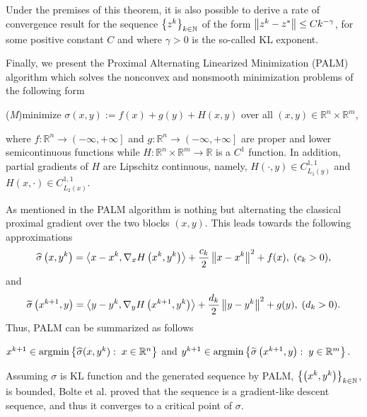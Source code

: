 \begin{remark}
Under the premises of this theorem, it is also possible to derive a rate of convergence result for the sequence $\left\lbrace z^k \right\rbrace_{k \in \mathbb{N}}$ of the form $\left\Vert {z^k - z^{*}} \right\Vert \leq Ck^{-\gamma}$, for some positive constant $C$ and where $\gamma>0$ is the so-called KL exponent.
\end{remark}

Finally, we present the Proximal Alternating Linearized Minimization (PALM) algorithm which solves the nonconvex and nonsmooth minimization problems of the following form
\begin{center}
(\textit{M})\quad minimize $\sigma(x,y):=f(x)+g(y)+H(x,y)$ over all $(x,y) \in \mathbb{R}^n \times \mathbb{R}^m$,
\end{center}
where $f:\mathbb{R}^n \rightarrow \left(-\infty,+\infty\right]$ and $g:\mathbb{R}^n \rightarrow \left(-\infty,+\infty\right]$ are proper and lower semicontinuous functions while $H:\mathbb{R}^n \times \mathbb{R}^m \rightarrow \mathbb{R}$ is a $C^1$ function. In addition, partial gradients of $H$ are Lipschitz continuous, namely, $H(\cdot, y) \in C^{1,1}_{L_1(y)}$ and $H(x,\cdot) \in C^{1,1}_{L_2(x)}$.\medskip

As mentioned in \cite{BST2014} the PALM algorithm is nothing but alternating the classical proximal gradient over the two blocks $(x,y)$. This leads towards the following approximations 
\begin{equation*}
	\widehat{\sigma}\left(x,y^k\right) = \left\langle x-x^k, \nabla_x H\left( x^k, y^k \right)\right\rangle + \frac{c_k}{2}\left\Vert {x-x^k} \right\Vert^2 + f(x), \; (c_k>0),
\end{equation*}
and
\begin{equation*}
	\widetilde{\sigma}\left(x^{k+1},y\right) = \left\langle y-y^k, \nabla_y H\left( x^{k+1}, y^k \right)\right\rangle + \frac{d_k}{2}\left\Vert {y-y^k} \right\Vert^2 + g(y), \; (d_k>0).
\end{equation*}
Thus, PALM can be summarized as follows
\begin{center}
$x^{k+1} \in \arg\!\min \left\lbrace \widehat{\sigma}(x,y^k) : \; x \in \mathbb{R}^n \right\rbrace$ \quad and \quad $y^{k+1} \in \arg\!\min \left\lbrace \widetilde{\sigma}\left(x^{k+1},y\right) : \; y \in \mathbb{R}^m \right\rbrace$.
\end{center}
Assuming $\sigma$ is KL function and the generated sequence by PALM, $\left\lbrace \left( x^k, y^k\right)\right\rbrace_{k \in \mathbb{N}}$, is bounded, Bolte et al. \cite{BST2014} proved that the sequence is a gradient-like descent sequence, and thus it converges to a critical point of $\sigma$. 
